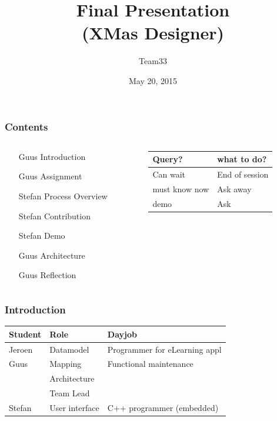\documentclass[11pt]{beamer}
\author{Team33}
\title{Final Presentation\\(XMas Designer)}
\institute{Open University/\\Guus Bonnema, Stefan Versluys, Jeroen Kleijn}
\date{May 20, 2015}
\begin{document}
\newcommand{\Noc}{\textsc{NoC}\xspace}
\newcommand{\qt}{\textsc{Qt}\xspace}
\newcommand{\qml}{\textsc{Qml}\xspace}
\newcommand{\ou}{\textsc{Ou}\xspace}
\newcommand{\dad}{\textsc{Dad}\xspace}

\begin{frame}
	\titlepage
\end{frame}

\begin{frame}
	\frametitle{Contents}
	\begin{columns}
		\begin{column}[t]{5cm}
			\begin{itemize}
				\item [Guus] Introduction 
				\item [Guus] Assignment
				\item [Stefan] Process Overview
				\item [Stefan] Contribution
				\item [Stefan] Demo
				\item [Guus] Architecture
				\item [Guus] Reflection
			\end{itemize}	
		\end{column}
		\begin{column}[t]{5cm}
			
			\begin{tabular}{ll}
				\hline
				{\tiny Query?} &  {\tiny what to do?} \\
				\hline
				{\tiny Can wait} & {\tiny End of session}\\
				{\tiny must know now} & {\tiny Ask away} \\
			 	{\tiny demo} & {\tiny Ask}\\
			 	\hline
			\end{tabular}
		\end{column}
	\end{columns}
	
\end{frame}

\begin{frame}
	\frametitle{Introduction}
	\begin{tabular}{lp{2.5cm}p{4cm}}
	\hline
	{\bf Student} & {\bf Role}      & {\bf Dayjob}\\\hline
	Jeroen        &  Datamodel      & Programmer for eLearning appl\\
	Guus	      &  Mapping        & Functional maintenance\\
	              &  Architecture   &                       \\
	              &  Team Lead     & \\
	Stefan        &  User interface & C++ programmer (embedded)\\
	\hline
	\end{tabular}
\end{frame}
\end{document}
